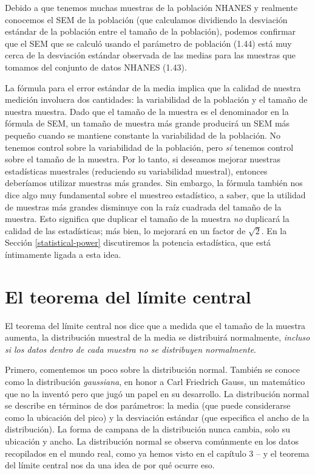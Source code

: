 \documentclass[
  12pt,
]{book}
\begin{document}
Debido a que tenemos muchas muestras de la población NHANES y realmente conocemos el SEM de la población (que calculamos dividiendo la desviación estándar de la población entre el tamaño de la población), podemos confirmar que el SEM que se calculó usando el parámetro de población (1.44) está muy cerca de la desviación estándar observada de las medias para las muestras que tomamos del conjunto de datos NHANES (1.43).

La fórmula para el error estándar de la media implica que la calidad de nuestra medición involucra dos cantidades: la variabilidad de la población y el tamaño de nuestra muestra. Dado que el tamaño de la muestra es el denominador en la fórmula de SEM, un tamaño de muestra más grande producirá un SEM más pequeño cuando se mantiene constante la variabilidad de la población. No tenemos control sobre la variabilidad de la población, pero \emph{sí} tenemos control sobre el tamaño de la muestra. Por lo tanto, si deseamos mejorar nuestras estadísticas muestrales (reduciendo su variabilidad muestral), entonces deberíamos utilizar muestras más grandes. Sin embargo, la fórmula también nos dice algo muy fundamental sobre el muestreo estadístico, a saber, que la utilidad de muestras más grandes disminuye con la raíz cuadrada del tamaño de la muestra. Esto significa que duplicar el tamaño de la muestra \emph{no} duplicará la calidad de las estadísticas; más bien, lo mejorará en un factor de \(\sqrt{2}\). En la Sección \ref{statistical-power} discutiremos la potencia estadística, que está íntimamente ligada a esta idea.

\hypertarget{the-central-limit-theorem}{%
\section{El teorema del límite central}\label{the-central-limit-theorem}}

El teorema del límite central nos dice que a medida que el tamaño de la muestra aumenta, la distribución muestral de la media se distribuirá normalmente, \emph{incluso si los datos dentro de cada muestra no se distribuyen normalmente}.

Primero, comentemos un poco sobre la distribución normal. También se conoce como la distribución \emph{gaussiana}, en honor a Carl Friedrich Gauss, un matemático que no la inventó pero que jugó un papel en su desarrollo. La distribución normal se describe en términos de dos parámetros: la media (que puede considerarse como la ubicación del pico) y la desviación estándar (que especifica el ancho de la distribución). La forma de campana de la distribución nunca cambia, solo su ubicación y ancho. La distribución normal se observa comúnmente en los datos recopilados en el mundo real, como ya hemos visto en el capítulo 3 -- y el teorema del límite central nos da una idea de por qué ocurre eso.
\end{document}
